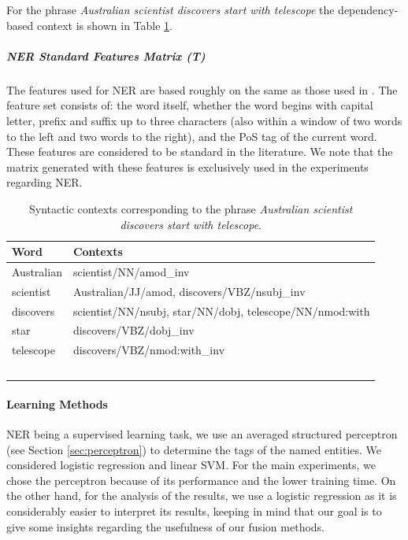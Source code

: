 For the phrase \textit{Australian scientist discovers start with telescope} the dependency-based context is shown in Table \ref{tab:syn-contexts}.
\subparagraph{NER Standard Features Matrix (T)}
The features used for NER are based roughly on the same as those used in \cite{Daume2006,Balasuriya2009}. The feature set consists of: the word itself, whether the word begins with capital letter, prefix and suffix up to three characters (also within a window of two words to the left and two words to the right), and the PoS tag of the current word. These features are considered to be standard in the literature. We note that the matrix generated with these features is exclusively used in the experiments regarding NER.	

\begin{table}
\centering
\begin{tabular}{ll}
\hline 
 Word & Contexts \\ 
\hline 
Australian & scientist/NN/amod\_inv \\ 
scientist  &  Australian/JJ/amod, discovers/VBZ/nsubj\_inv\\ 
discovers & scientist/NN/nsubj, star/NN/dobj, telescope/NN/nmod:with \\ 
star & discovers/VBZ/dobj\_inv \\ 
telescope  &  discovers/VBZ/nmod:with\_inv \\ 
\hline \
\end{tabular} 
\caption{Syntactic contexts corresponding to the phrase \textit{Australian scientist discovers start with telescope}.}
\label{tab:syn-contexts}
\end{table}


\paragraph{Learning Methods}
NER being a supervised learning task, we use an averaged structured perceptron  \cite{Collins2002,Daume2006} (see Section \ref{sec:perceptron}) to determine the tags of the named entities. We considered logistic regression and linear SVM. For the main experiments, we chose the perceptron because of its performance and the lower training time. On the other hand, for the analysis of the results, we use a logistic regression as it is considerably easier to interpret its results, keeping in mind that our goal is to give some insights regarding the usefulness of our fusion methods.




